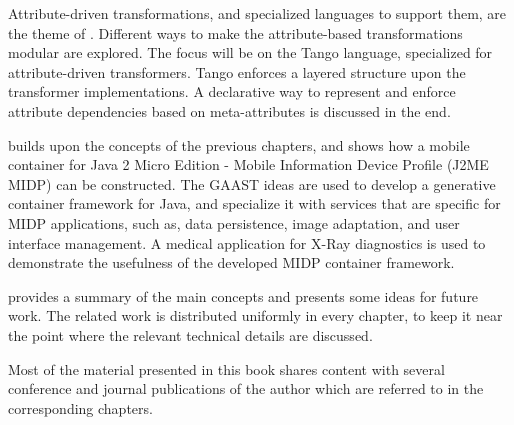 Attribute-driven transformations, and specialized languages to support them, are the theme of . Different ways to make the attribute-based transformations modular  are explored. The focus will be on the Tango language, specialized for attribute-driven transformers. Tango enforces a layered structure upon the transformer implementations. A declarative way to represent and enforce attribute dependencies based on meta-attributes is discussed in the end.

 builds upon the concepts of the previous chapters, and shows how a mobile container for Java 2 Micro Edition - Mobile Information Device Profile (J2ME MIDP) can be constructed. The GAAST ideas are used to develop a generative container framework for Java, and specialize it with services that are specific for MIDP applications, such as, data persistence, image adaptation, and user interface management. A medical application for X-Ray diagnostics is used to demonstrate the usefulness of the developed MIDP container framework.

 provides a summary of the main concepts and presents some ideas for future work. The related work is distributed uniformly in every chapter, to keep it near the point where the relevant technical details are discussed. 

Most of the material presented in this book shares content with several conference and journal publications of the author which are referred to in the corresponding chapters.